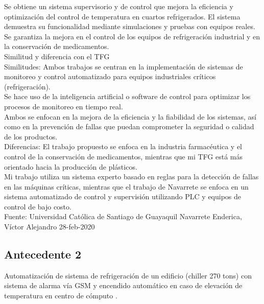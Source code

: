 Se obtiene un sistema supervisorio y de control que mejora la eficiencia y optimización del control de temperatura en cuartos refrigerados.
El sistema demuestra su funcionalidad mediante simulaciones y pruebas con equipos reales.
Se garantiza la mejora en el control de los equipos de refrigeración industrial y en la conservación de medicamentos.\\
Similitud y diferencia con el TFG \\
Similitudes: Ambos trabajos se centran en la implementación de sistemas de monitoreo y control automatizado para equipos industriales críticos (refrigeración).\\
Se hace uso de la inteligencia artificial o software de control para optimizar los procesos de monitoreo en tiempo real.\\
Ambos se enfocan en la mejora de la eficiencia y la fiabilidad de los sistemas, así como en la prevención de fallas que puedan comprometer la seguridad o calidad de los productos.\\
Diferencias: El trabajo propuesto se enfoca en la industria farmacéutica y el control de la conservación de medicamentos, mientras que mi TFG está más orientado hacia la producción de plásticos.\\
Mi trabajo utiliza un sistema experto basado en reglas para la detección de fallas en las máquinas críticas, mientras que el trabajo de Navarrete se enfoca en un sistema automatizado de control y supervisión utilizando PLC y equipos de control de bajo costo.\\
Fuente: Universidad Católica de Santiago de Guayaquil Navarrete Enderica, Víctor Alejandro 28-feb-2020


\subsection{Antecedente 2}
Automatización de sistema de refrigeración de un edificio (chiller 270 tons)
con sistema de alarma vía GSM y encendido automático en caso de elevación
de temperatura en centro de cómputo \cite{Lema}. \\

